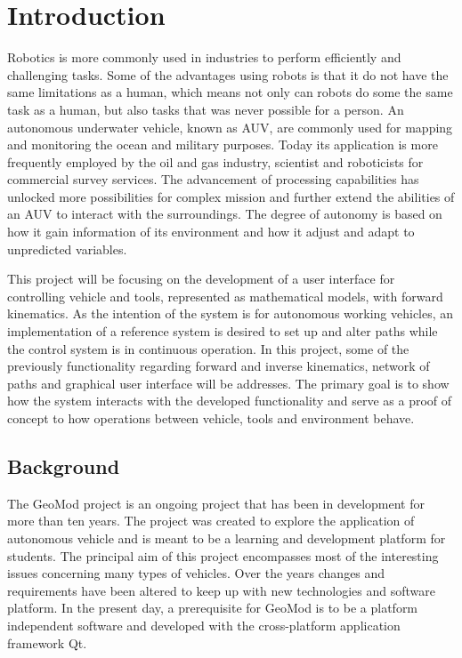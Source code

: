 \chapter{Introduction}

Robotics is more commonly used in industries to perform efficiently and challenging tasks. Some of the advantages using robots is that it do not have the same limitations as a human, which means not only can robots do some the same task as a human, but also tasks that was never possible for a person. An autonomous underwater vehicle, known as AUV, are commonly used for mapping and monitoring the ocean and military purposes. Today its application is more frequently employed by the oil and gas industry, scientist and roboticists for commercial survey services. The advancement of processing capabilities has unlocked more possibilities for complex mission and further extend the abilities of an AUV to interact with the surroundings. The degree of autonomy is based on how it gain information of its environment and how it adjust and adapt to unpredicted variables.

This project will be focusing on the development of a user interface for controlling vehicle and tools, represented as mathematical models, with forward kinematics. As the intention of the system is for autonomous working vehicles, an implementation of a reference system is desired to set up and alter paths while the control system is in continuous operation. In this project, some of the previously functionality regarding forward and inverse kinematics, network of paths and graphical user interface will be addresses. The primary goal is to show how the system interacts with the developed functionality and serve as a proof of concept to how operations between vehicle, tools and environment behave.



\section{Background}

The GeoMod project is an ongoing project that has been in development for more than ten years. The project was created to explore the application of autonomous vehicle and is meant to be a learning and development platform for students. The principal aim of this project encompasses most of the interesting issues concerning many types of vehicles. Over the years changes and requirements have been altered to keep up with new technologies and software platform. In the present day, a prerequisite for GeoMod is to be a platform independent software and developed with the cross-platform application framework Qt. 


